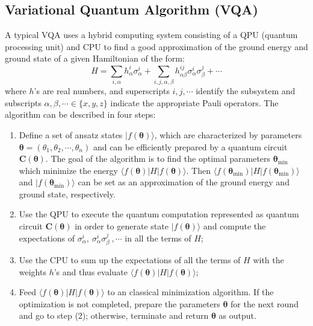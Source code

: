 \documentclass[conference,compsoc, 10pt]{IEEEtran}
\newcommand{\jh}[1]{\textit{\color{red}[JH] : #1}}
\newcommand{\lz}[1]{\textit{\color{blue}[LZ] : #1}}
\newcommand {\prog } {{\mathbf{C}}}
\def\>{\ensuremath{\rangle}}
\def\<{\ensuremath{\langle}}
\begin{document}
	\subsection{Variational Quantum Algorithm (VQA)}
	A typical VQA uses a hybrid computing system consisting of a QPU (quantum processing unit) and CPU to find a good approximation of the ground energy and ground state of a given Hamiltonian of the form:
	$$H = \sum_{i,\alpha}h_\alpha^i\sigma_\alpha^i + \sum_{i,j,\alpha,\beta}h_{\alpha\beta}^{ij}\sigma_\alpha^i\sigma_\beta^j+\cdots$$
	where $h$'s are real numbers, and superscripts $i,j,\cdots$ identify the subsystem and subscripts $\alpha,\beta,\cdots\in\{x,y,z\}$ indicate the appropriate Pauli operators. The algorithm can be described in four steps:
	\begin{enumerate}
		\item Define a set of ansatz states $|f(\boldsymbol{\theta})\>$, which are characterized by  parameters $\boldsymbol{\theta} = (\theta_1,\theta_2,\cdots,\theta_n)$ and can be efficiently prepared by a quantum circuit $\prog(\boldsymbol{\theta})$. The goal of the algorithm is to find the optimal parameters $\boldsymbol{\theta}_{\min}$ which minimize the energy $\<f(\boldsymbol{\theta})|H|f(\boldsymbol{\theta})\>$. Then $\<f(\boldsymbol{\theta}_{\min})|H|f(\boldsymbol{\theta}_{\min})\>$ and $|f(\boldsymbol{\theta}_{\min})\>$ can be set as an approximation of the ground energy and ground state, respectively.
		
		\item Use the QPU to execute the quantum computation represented as quantum circuit $\prog(\boldsymbol{\theta})$ in order to generate state $|f(\boldsymbol{\theta})\>$ and compute the expectations of $\sigma_\alpha^i,\ \sigma_\alpha^i\sigma_\beta^j\ ,\cdots$ in all the terms of $H$;
		
		\item Use the CPU to sum up the expectations of all the terms of $H$ with the weights $h$'s and thus evaluate $\<f(\boldsymbol{\theta})|H|f(\boldsymbol{\theta})\>$;
		
		\item Feed $\<f(\boldsymbol{\theta})|H|f(\boldsymbol{\theta})\>$ to an classical minimization algorithm. If the optimization is not completed, prepare the parameters $\boldsymbol{\theta}$ for the next round and go to step (2); otherwise, terminate and return $\boldsymbol{\theta}$ as output.
	\end{enumerate}
	
\end{document}
